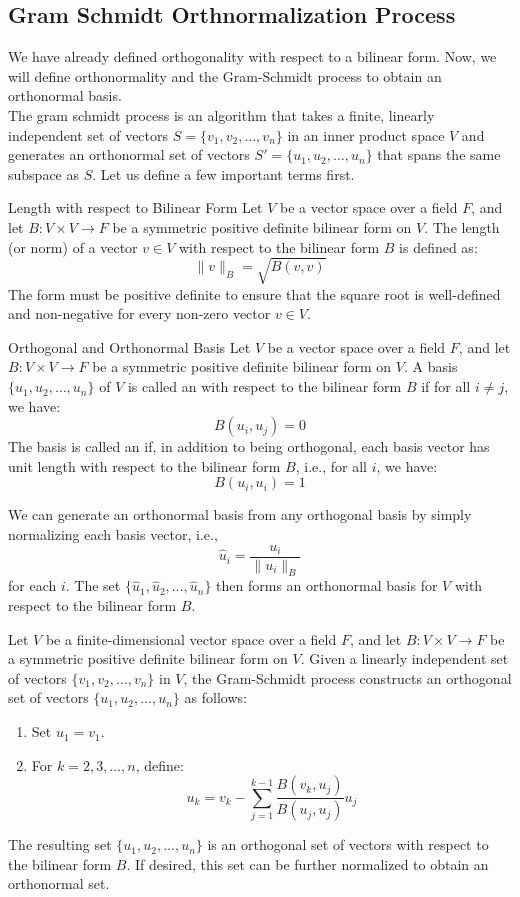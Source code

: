 \documentclass[openany]{book}
\begin{document}
\subsection{Gram Schmidt Orthnormalization Process}
We have already defined orthogonality with respect to a bilinear form. Now, we will define orthonormality and the Gram-Schmidt process to obtain an orthonormal basis. \\
The gram schmidt process is an algorithm that takes a finite, linearly independent set of vectors $S = \{v_1, v_2, \ldots, v_n\}$ in an inner product space $V$ and generates an orthonormal set of vectors $S' = \{u_1, u_2, \ldots, u_n\}$ that spans the same subspace as $S$. Let us define a few important terms first. 
\begin{mydefinition}{Length with respect to Bilinear Form}
Let $V$ be a vector space over a field $F$, and let $B: V \times V \to F$ be a symmetric positive definite bilinear form on $V$. The length (or norm) of a vector $v \in V$ with respect to the bilinear form $B$ is defined as:
$$\|v\|_B = \sqrt{B(v, v)}$$
The form must be positive definite to ensure that the square root is well-defined and non-negative for every non-zero vector $v \in V$.
\end{mydefinition}
\begin{mydefinition}{Orthogonal and Orthonormal Basis}
Let $V$ be a vector space over a field $F$, and let $B: V \times V \to F$ be a symmetric positive definite bilinear form on $V$. A basis $\{u_1, u_2, \ldots, u_n\}$ of $V$ is called an  with respect to the bilinear form $B$ if for all $i \neq j$, we have:
$$B(u_i, u_j) = 0$$
The basis is called an  if, in addition to being orthogonal, each basis vector has unit length with respect to the bilinear form $B$, i.e., for all $i$, we have:
$$B(u_i, u_i) = 1$$
\end{mydefinition}
We can generate an orthonormal basis from any orthogonal basis by simply normalizing each basis vector, i.e., 
$$\hat{u}_i = \frac{u_i}{\|u_i\|_B}$$
for each $i$. The set $\{\hat{u}_1, \hat{u}_2, \ldots, \hat{u}_n\}$ then forms an orthonormal basis for $V$ with respect to the bilinear form $B$. \\
\begin{mytheorem}
Let $V$ be a finite-dimensional vector space over a field $F$, and let $B: V \times V \to F$ be a symmetric positive definite bilinear form on $V$. Given a linearly independent set of vectors $\{v_1, v_2, \ldots, v_n\}$ in $V$, the Gram-Schmidt process constructs an orthogonal set of vectors $\{u_1, u_2, \ldots, u_n\}$ as follows:
\begin{enumerate}
    \item Set $u_1 = v_1$.
    \item For $k = 2, 3, \ldots, n$, define:
    $$u_k = v_k - \sum_{j=1}^{k-1} \frac{B(v_k, u_j)}{B(u_j, u_j)} u_j$$
\end{enumerate}
The resulting set $\{u_1, u_2, \ldots, u_n\}$ is an orthogonal set of vectors with respect to the bilinear form $B$. If desired, this set can be further normalized to obtain an orthonormal set.
\end{mytheorem}
\end{document}
